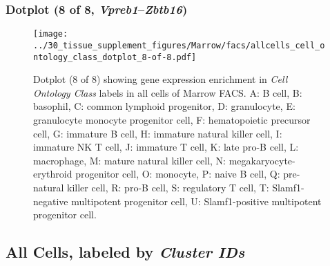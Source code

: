 \subsubsection{Dotplot (8 of 8, \emph{Vpreb1}--\emph{Zbtb16})}
\begin{figure}[h]
\centering
\texttt{[image: ../30\_tissue\_supplement\_figures/Marrow/facs/allcells\_cell\_ontology\_class\_dotplot\_8-of-8.pdf]}

\caption{ Dotplot (8 of 8)  showing gene expression enrichment in \emph{Cell Ontology Class} labels in all cells of Marrow FACS. A: B cell, B: basophil, C: common lymphoid progenitor, D: granulocyte, E: granulocyte monocyte progenitor cell, F: hematopoietic precursor cell, G: immature B cell, H: immature natural killer cell, I: immature NK T cell, J: immature T cell, K: late pro-B cell, L: macrophage, M: mature natural killer cell, N: megakaryocyte-erythroid progenitor cell, O: monocyte, P: naive B cell, Q: pre-natural killer cell, R: pro-B cell, S: regulatory T cell, T: Slamf1-negative multipotent progenitor cell, U: Slamf1-positive multipotent progenitor cell.}
\end{figure}


\clearpage

\subsection{All Cells, labeled by \emph{Cluster IDs}}
